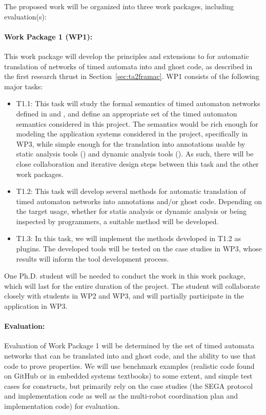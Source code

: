 The proposed work will be organized into three work packages,
including evaluation(s):

\paragraph{Work Package 1 (WP1):} This work package will develop the principles and extensions to \framac for automatic translation of networks of timed automata into \acsl and ghost code, as described in the first research thrust in Section~\ref{sec:ta2framac}.
WP1 consists of the following major tasks:
\begin{itemize}[labelsep=3pt,leftmargin=12pt]

\item T1.1: This task will study the formal semantics of timed automaton networks defined in \uppaal and \prism, and define an appropriate set of the timed automaton semantics considered in this project.  The semantics would be rich enough for modeling the application systems considered in the project, specifically in WP3, while simple enough for the translation into annotations usable by static analysis tools (\framac) and dynamic analysis tools (\deepstate).  As such, there will be close collaboration and iterative design steps between this task and the other work packages. %

\item T1.2: This task will develop several methods for automatic translation of timed automaton networks into \acsl annotations and/or ghost code.  Depending on the target usage, whether for statis analysis or dynamic analysis or being inspected by programmers, a suitable method will be developed.

\item T1.3: In this task, we will implement the methods developed in T1.2 as \framac plugins.  The developed tools will be tested on the case studies %
  in WP3, whose results will inform the tool development process.
\end{itemize}

One Ph.D. student will be needed to conduct the work in this work package, which will last for the entire duration of the project.
The student will collaborate closely with students in WP2 and WP3, and
will partially participate in the application in WP3.

\paragraph{Evaluation:} Evaluation of
Work Package 1 will be determined by the set of timed automata
networks that can be translated into \acsl and ghost code, and the
ability to use that code to prove properties.  We will use benchmark
examples (realistic code found on GitHub or in embedded systems
textbooks) to some extent, and simple test cases for constructs, but
primarily rely on the case studies (the SEGA protocol and
implementation code as well as the multi-robot coordination plan and
implementation code) for evaluation.


